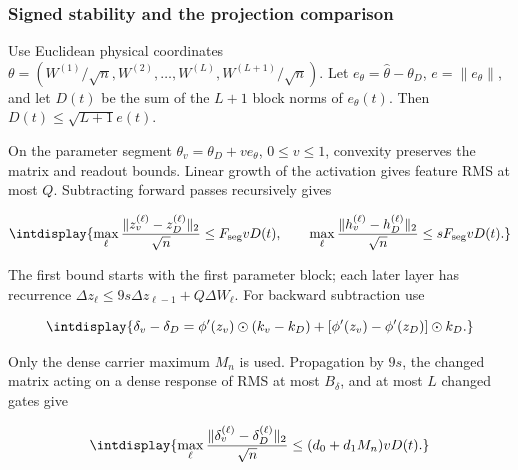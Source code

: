 \subsubsection{Signed stability and the projection comparison}
\label{int:legendre-stability-proof}


Use Euclidean physical coordinates \(\theta=(W^{(1)}/\sqrt n,\allowbreak W^{(2)},\allowbreak \ldots,\allowbreak W^{(L)},\allowbreak  W^{(L+1)}/\sqrt n)\). Let \(e_\theta=\widehat\theta-\theta_D\), \(e=\|e_\theta\|\), and let \(D(t)\) be the sum of the \(L+1\) block norms of \(e_\theta(t)\). Then \(D(t)\le\sqrt{L+1}e(t)\).



On the parameter segment \(\theta_v=\theta_D+ve_\theta\), \(0\le v\le1\), convexity preserves the matrix and readout bounds. Linear growth of the activation gives feature RMS at most \(Q\). Subtracting forward passes recursively gives


\begingroup\renewcommand{\theHequation}{intdisplay.528}
\begin{equation*}
\intdisplay{
\max_\ell\frac{\|z_v^{(\ell)}-z_D^{(\ell)}\|_2}{\sqrt n}
\le F_{\rm seg}vD(t),\qquad
\max_\ell\frac{\|h_v^{(\ell)}-h_D^{(\ell)}\|_2}{\sqrt n}
\le sF_{\rm seg}vD(t).
}
\end{equation*}
\endgroup


The first bound starts with the first parameter block; each later layer has recurrence \(\Delta z_\ell\le9s\Delta z_{\ell-1} +Q\Delta W_\ell\). For backward subtraction use


\begingroup\renewcommand{\theHequation}{intdisplay.529}
\begin{equation*}
\intdisplay{
\delta_v-\delta_D
=\phi'(z_v)\odot(k_v-k_D)
+[\phi'(z_v)-\phi'(z_D)]\odot k_D.
}
\end{equation*}
\endgroup


Only the dense carrier maximum \(M_n\) is used. Propagation by \(9s\), the changed matrix acting on a dense response of RMS at most \(B_\delta\), and at most \(L\) changed gates give


\begingroup\renewcommand{\theHequation}{intdisplay.530}
\begin{equation*}
\intdisplay{
\max_\ell\frac{\|\delta_v^{(\ell)}-\delta_D^{(\ell)}\|_2}{\sqrt n}
\le(d_0+d_1M_n)vD(t).
}
\end{equation*}
\endgroup

